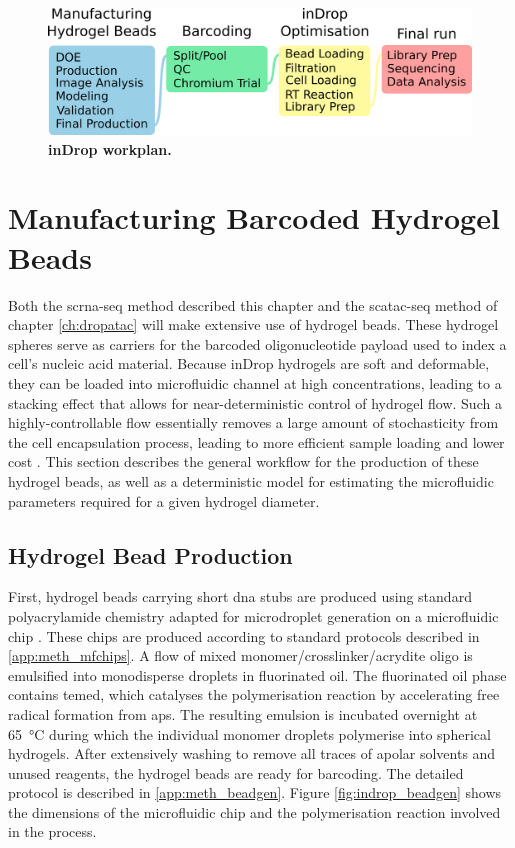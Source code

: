 \begin{figure}[ht]
\centerfloat
\includegraphics[width=\textwidth]{./ims/indrop_workplan.png}
\caption[inDrop workplan]{\textbf{inDrop workplan.}}
\label{fig:indrop_workplan}
\end{figure}

\newpage
\section{Manufacturing Barcoded Hydrogel Beads}
\label{sec:indrop_bhbproduction}
Both the \acrshort{scrna-seq} method described this chapter and the \acrshort{scatac-seq} method of chapter \ref{ch:dropatac} will make extensive use of hydrogel beads. These hydrogel spheres serve as carriers for the barcoded oligonucleotide payload used to index a cell's nucleic acid material. Because inDrop hydrogels are soft and deformable, they can be loaded into microfluidic channel at high concentrations, leading to a stacking effect that allows for near-deterministic control of hydrogel flow. Such a highly-controllable flow essentially removes a large amount of stochasticity from the cell encapsulation process, leading to more efficient sample loading and lower cost \citep{klein2015, abate2009}. This section describes the general workflow for the production of these hydrogel beads, as well as a deterministic model for estimating the microfluidic parameters required for a given hydrogel diameter.\pms

\subsection{Hydrogel Bead Production}
\label{subsect:indrop_beadproduction}
First, hydrogel beads carrying short \acrshort{dna} stubs are produced using standard polyacrylamide chemistry adapted for microdroplet generation on a microfluidic chip \citep{zilionis2017}. These chips are produced according to standard protocols described in \ref{app:meth_mfchips}. A flow of mixed monomer/crosslinker/acrydite oligo is emulsified into monodisperse droplets in fluorinated oil. The fluorinated oil phase contains \acrshort{temed}, which catalyses the polymerisation reaction by accelerating free radical formation from \acrshort{aps}. The resulting emulsion is incubated overnight at \SI{65}{\celsius} during which the individual monomer droplets polymerise into spherical hydrogels. After extensively washing to remove all traces of apolar solvents and unused reagents, the hydrogel beads are ready for barcoding. The detailed protocol is described in \ref{app:meth_beadgen}. Figure \ref{fig:indrop_beadgen} shows the dimensions of the microfluidic chip and the polymerisation reaction involved in the process.\pms


